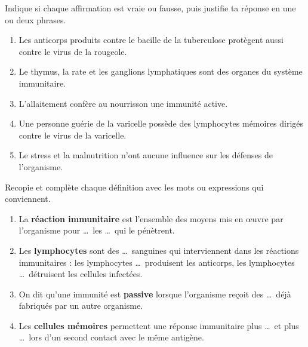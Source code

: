 \documentclass[11pt]{article}
\begin{document}
\begin{exercice}
Indique si chaque affirmation est vraie ou fausse, puis justifie ta réponse en une ou deux phrases.
\begin{enumerate}
\item Les anticorps produits contre le bacille de la tuberculose protègent aussi contre le virus de la rougeole.
\item Le thymus, la rate et les ganglions lymphatiques sont des organes du système immunitaire.
\item L'allaitement confère au nourrisson une immunité active.
\item Une personne guérie de la varicelle possède des lymphocytes mémoires dirigés contre le virus de la varicelle.
\item Le stress et la malnutrition n'ont aucune influence sur les défenses de l'organisme.
\end{enumerate}
\end{exercice}

\begin{exercice}
Recopie et complète chaque définition avec les mots ou expressions qui conviennent.
\begin{enumerate}
\item La \textbf{réaction immunitaire} est l'ensemble des moyens mis en \oe uvre par l'organisme pour \ldots\ les \ldots\ qui le pénètrent.
\item Les \textbf{lymphocytes} sont des \ldots\ sanguines qui interviennent dans les réactions immunitaires : les lymphocytes \ldots\ produisent les anticorps, les lymphocytes \ldots\ détruisent les cellules infectées.
\item On dit qu'une immunité est \textbf{passive} lorsque l'organisme reçoit des \ldots\ déjà fabriqués par un autre organisme.
\item Les \textbf{cellules mémoires} permettent une réponse immunitaire plus \ldots\ et plus \ldots\ lors d'un second contact avec le même antigène.
\end{enumerate}
\end{exercice}
\end{document}
